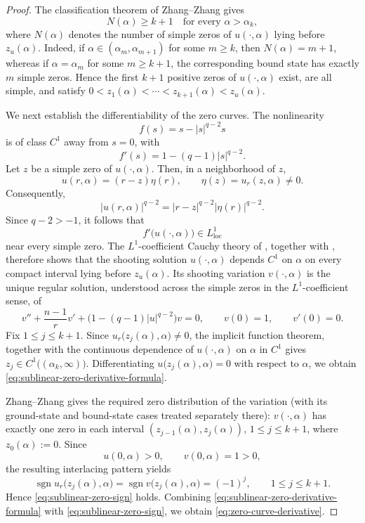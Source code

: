 \documentclass[11pt]{article}
\begin{document}
\begin{proof}
The classification theorem of Zhang--Zhang \cite{ZhangZhang} gives
\[
 N(\alpha)\geq k+1
 \quad\text{for every }\alpha>\alpha_k,
\]
where \(N(\alpha)\) denotes the number of simple zeros of
\(u(\cdot,\alpha)\) lying before
\(z_u(\alpha)\).  Indeed, if
\(\alpha\in(\alpha_m,\alpha_{m+1})\) for some \(m\geq k\), then
\(N(\alpha)=m+1\), whereas if \(\alpha=\alpha_m\) for some
\(m\geq k+1\), the corresponding bound state has exactly \(m\)
simple zeros.  Hence {the first $k+1$ positive zeros} of
\(u(\cdot,\alpha)\) exist, are all simple, and {satisfy}
$0<z_1(\alpha)<\cdots<z_{k+1}(\alpha)<z_u(\alpha)$.


We next establish the differentiability of the zero curves. The nonlinearity
\[
f(s)=s-|s|^{q-2}s
\]
is of class \(C^1\) away from \(s=0\), with
\[
f'(s)=1-(q-1)|s|^{q-2}.
\]
Let \(z\) be a simple zero of \(u(\cdot,\alpha)\). Then, in a
neighborhood of \(z\),
\[
u(r,\alpha)=(r-z)\eta(r),
\qquad
\eta(z)=u_r(z,\alpha)\neq0.
\]
Consequently,
\[
|u(r,\alpha)|^{q-2}
=
|r-z|^{q-2}|\eta(r)|^{q-2}.
\]
Since \(q-2>-1\), it follows that
\[
f'\bigl(u(\cdot,\alpha)\bigr)\in L^1_{\mathrm{loc}}
\]
near every simple zero. The \(L^1\)-coefficient Cauchy theory of
\cite[Proposition~2.1]{ZhangZhang}, together with
\cite[Lemmas~2.2 and 3.1]{ZhangZhang},
therefore shows that the shooting solution $u(\cdot,\alpha)$ {depends $C^1$ on $\alpha$} on every compact interval lying before \(z_u(\alpha)\). Its shooting variation $v(\cdot,\alpha)$
is the unique regular solution, understood across the simple zeros in
the \(L^1\)-coefficient sense, of
\[
 v''+\frac{n-1}{r}v'+\bigl(1-(q-1)|u|^{q-2}\bigr)v=0,
 \qquad
 v(0)=1,
 \qquad
 v'(0)=0.
\]
Fix \(1\leq j\leq k+1\). Since $u_r\bigl(z_j(\alpha),\alpha\bigr)\neq0$,
the implicit function theorem, together with the {continuous dependence of $u(\cdot,\alpha)$ on $\alpha$ in $C^1$}
gives $z_j\in C^1\bigl((\alpha_k,\infty)\bigr)$.
Differentiating $u\bigl(z_j(\alpha),\alpha\bigr)=0$
with respect to \(\alpha\), we obtain \eqref{eq:sublinear-zero-derivative-formula}.

{Zhang--Zhang \cite[Lemma 5.1]{ZhangZhang} gives the required
zero distribution of the variation (with its ground-state and bound-state
cases treated separately there):}
\(v(\cdot,\alpha)\) has exactly one zero in each interval
\((z_{j-1}(\alpha),z_j(\alpha))\), $1\leq j \leq k+1$, where $z_0(\alpha):=0$. Since
\[
u(0,\alpha)>0,
\qquad
v(0,\alpha)=1>0,
\]
the resulting interlacing pattern yields
\[
\operatorname{sgn}u_r\bigl(z_j(\alpha),\alpha\bigr)
=
\operatorname{sgn}v\bigl(z_j(\alpha),\alpha\bigr)
=
(-1)^j,
\qquad 1\leq j\leq k+1.
\]
 Hence \eqref{eq:sublinear-zero-sign} holds. Combining
\eqref{eq:sublinear-zero-derivative-formula} with
\eqref{eq:sublinear-zero-sign}, we obtain \eqref{eq:zero-curve-derivative}.
\end{proof}
\end{document}
